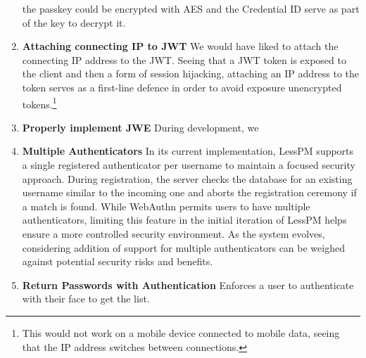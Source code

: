 \begin{enumerate}[label=$\blacktriangleright$]
        the passkey could be encrypted with AES and the Credential ID serve
        as part of the key to decrypt it.
        \item \textbf{Attaching connecting IP to JWT}
        \newline We would have liked to attach the connecting IP address to the
        JWT\@.
        Seeing that a JWT token is exposed to the client and then a form of
        session hijacking, attaching an IP address to the token serves as a
        first-line defence in order to avoid exposure unencrypted
        tokens.\footnote{
            This would not work on a mobile device connected to mobile data,
            seeing that the IP address switches between connections.
        }
        \item \textbf{Properly implement JWE}
        \newline During development, we
        \item \textbf{Multiple Authenticators}
        \newline In its current implementation, LessPM supports a single
        registered authenticator per username to maintain a focused security
        approach.
        During registration, the server checks the database for an existing
        username similar to the incoming one and aborts the registration
        ceremony if a match is found.
        While WebAuthn permits users to have multiple authenticators, limiting
        this feature in the initial iteration of LessPM helps ensure a more
        controlled security environment.
        As the system evolves, considering addition of support for multiple
        authenticators can be weighed against potential security risks and
        benefits.
        \item \textbf{Return Passwords with Authentication}
        \newline Enforces a user to authenticate with their face to get the
        list.
    \end{enumerate}